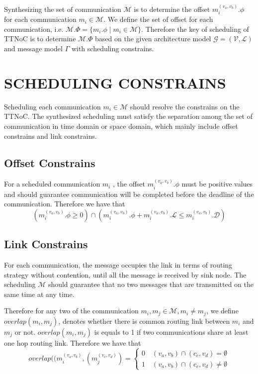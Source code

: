 \documentclass[conference]{IEEEtran}
\begin{document}
Synthesizing the set of communication $\mathcal{M}$  is to determine the offset $m_{i}^{(v_{a},v_{b})}.\phi$ for each communication $m_{i}\in\mathcal{M}$. We define the set of offset for each communication, i.e. $\mathcal{M}.\Phi=\{ m_{i}.\phi \mid m_{i}\in \mathcal{M} \}$. Therefore the key of scheduling of TTNoC is to determine $\mathcal{M}.\Phi$ based on the given architecture model $\mathcal{G}=(\mathcal{V},\mathcal{L})$ and message model $\Gamma$ with scheduling constrains.

\section{SCHEDULING CONSTRAINS}

Scheduling each communication $m_{i}\in\mathcal{M}$ should resolve the constrains on the TTNoC. The synthesized scheduling must satisfy the separation among the set of communication in time domain or space domain, which mainly include offset constrains and link constrains.

\subsection{Offset Constrains}

For a scheduled communication $m_{i}$ , the offset $m_{i}^{(v_{a},v_{b})}.\phi$  must be positive values and should guarantee communication will be completed before the deadline of the communication. Therefore we have that
\begin{equation}
	(m_{i}^{(v_{a},v_{b})}.\phi
	\geq 0)
	\cap
	(m_{i}^{(v_{a},v_{b})}.\phi + m_{i}^{(v_{a},v_{b})}.\mathcal{L} \leq m_{i}^{(v_{a},v_{b})}.\mathcal{D})
\end{equation}

\subsection{Link Constrains}

For each communication, the message occupies the link in terms of routing strategy without contention, until all the message is received by sink node. The scheduling $\mathcal{M}$ should guarantee that no two messages that are transmitted on the same time at any time.

Therefore for any two of the communication $m_{i},m_{j}\in\mathcal{M}, m_{i}\neq m_{j}$, we define $ overlap(m_{i},m_{j}) $, denotes whether there is common routing link between $m_{i}$ and $m_{j}$ or not. $ overlap(m_{i},m_{j}) $ is equals to 1 if two communications share at least one hop routing link. Therefore we have that
\begin{equation}
overlap((m_{i}^{(v_{a},v_{b})},(m_{j}^{(v_{c},v_{d})})= 
	\begin{cases}
	0 \quad (v_{a},v_{b}) \cap (c_{c},v_{d}) = \emptyset\\
	1 \quad (v_{a},v_{b}) \cap (c_{c},v_{d}) \neq \emptyset
\end{cases}
\end{equation}
\end{document}
